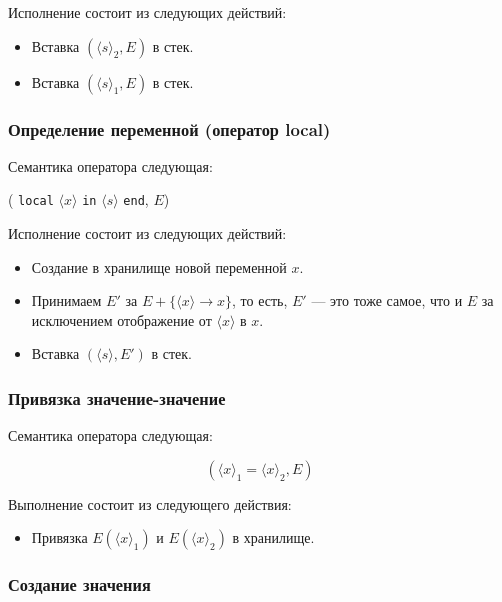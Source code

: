 Исполнение состоит из следующих действий:

\begin{itemize}
\item{Вставка $( {\langle s \rangle}_{2}, E)$ в стек.}

\item{Вставка $( {\langle s \rangle}_{1}, E)$ в стек.}
\end{itemize}

\subsubsection{Определение переменной (оператор local)}

Семантика оператора следующая:

( \lstinline|local| $\langle x \rangle$ \lstinline|in| $\langle s \rangle$ \lstinline|end|, $E$)

Исполнение состоит из следующих действий:

\begin{itemize}
\item{Создание в хранилище новой переменной $x$.}

\item{Принимаем $E'$ за $E+\{ \langle x \rangle \to x\}$, то есть, $E'$ --- это тоже самое, что и $E$ за исключением отображение от $\langle x \rangle$ в $x$.}

\item{Вставка $(\langle s \rangle,E')$ в стек.}
\end{itemize}

\subsubsection{Привязка значение-значение}

Семантика оператора следующая:

$$({\langle x \rangle}_{1} = {\langle x \rangle}_{2},E)$$

Выполнение состоит из следующего действия:

\begin{itemize}
\item{Привязка $E({\langle x \rangle}_{1})$ и $E({\langle x \rangle}_{2})$ в хранилище.}
\end{itemize}

\subsubsection{Создание значения}

